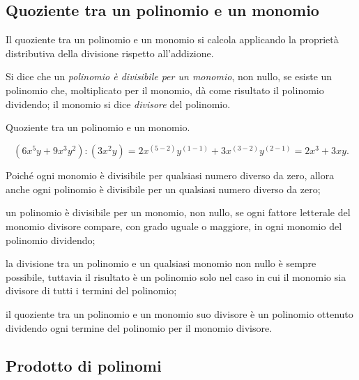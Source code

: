 
\subsection{Quoziente tra un polinomio e un monomio}
\label{subsec:10_poli_quozientepermonomio}

Il quoziente tra un polinomio e un monomio si calcola applicando la
proprietà distributiva della divisione rispetto
all'addizione.

\begin{definizione}
 Si dice che un \emph{polinomio è divisibile per un monomio}, non
nullo, se esiste un polinomio che, moltiplicato per il monomio, dà
come risultato il polinomio dividendo; il monomio si dice
\emph{divisore} del polinomio.
\end{definizione}

 \begin{esempio}
 Quoziente tra un polinomio e un monomio.
 
\[\left(6x^{5}y+9x^{3}y^{2}\right):\left(3x^{2}y\right)=2x^{(5-2)}y^{(1-1)}
+3x^{(3-2)}y^{(2-1)}=2x^{3}+3{xy}.\]
 \end{esempio}
\osservazione

\begin{enumeratea}
\item Poiché ogni monomio è divisibile per qualsiasi numero diverso
da zero, allora anche ogni polinomio è divisibile per un qualsiasi
numero diverso da zero;
\item un polinomio è divisibile per un monomio, non nullo, se ogni
fattore letterale del monomio divisore compare, con grado uguale o
maggiore, in ogni monomio del polinomio dividendo;
\item la divisione tra un polinomio e un qualsiasi monomio non nullo è
sempre possibile, tuttavia il risultato è un polinomio solo nel caso
in cui il monomio sia divisore di tutti i termini del polinomio;
\item il quoziente tra un polinomio e un monomio suo divisore è un
polinomio ottenuto dividendo ogni termine del polinomio per il monomio
divisore.
\end{enumeratea}


\subsection{Prodotto di polinomi}
\label{subsec:10_poli_prodotto}

